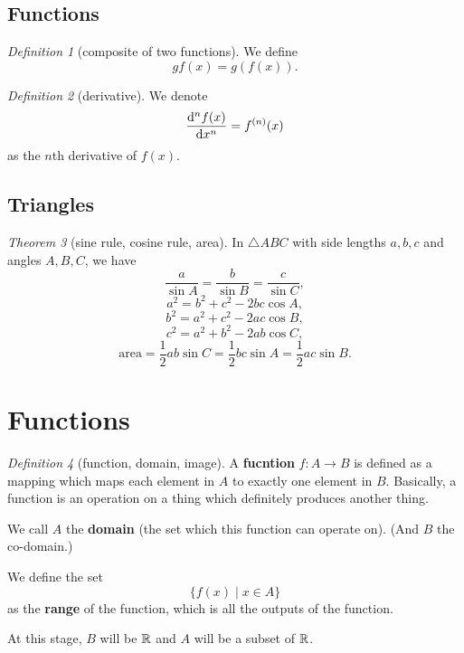 \documentclass[8pt]{article}
\theoremstyle{remark}
\newtheorem{theorem}{Theorem}[section]
\newtheorem{definition}[theorem]{Definition}
\begin{document}
        \subsection{Functions}
            \begin{definition}[composite of two functions]
                We define
                $$
                    gf(x) = g(f(x)).
                $$
            \end{definition}

            \begin{definition}[derivative]
                We denote
                $$
                    \frac{\mathrm{d}^n f(x)}{\mathrm{d} x^n} = f^{(n)} (x)
                $$
                as the $n$th derivative of $f(x)$.
            \end{definition}

        \subsection{Triangles}
            \begin{theorem}[sine rule, cosine rule, area]
                In $\triangle ABC$ with side lengths $a, b, c$ and angles $A, B, C$, we have
                $$
                    \frac{a}{\sin A} = \frac{b}{\sin B} = \frac{c}{\sin C},
                $$
                $$
                    a^2 = b^2 + c^2 - 2bc \cos A,
                $$
                $$
                    b^2 = a^2 + c^2 - 2ac \cos B,
                $$
                $$
                    c^2 = a^2 + b^2 - 2ab \cos C,
                $$
                $$
                    \text{area}=\frac{1}{2} ab \sin C = \frac{1}{2} bc \sin A = \frac{1}{2} ac \sin B.
                $$
            \end{theorem}

    \section{Functions}

        \begin{definition}[function, domain, image]
            A \textbf{fucntion} $f: A \rightarrow B$ is defined as a mapping which maps each element in $A$ to exactly one element in $B$. Basically, a function is an operation on a thing which definitely produces another thing.

            We call $A$ the \textbf{domain} (the set which this function can operate on). (And $B$ the co-domain.)

            We define the set
            $$
                \{f(x) \mid x \in A\}
            $$
            as the \textbf{range} of the function, which is all the outputs of the function.

            At this stage, $B$ will be $\mathbb{R}$ and $A$ will be a subset of $\mathbb{R}$.
        \end{definition}
\end{document}
